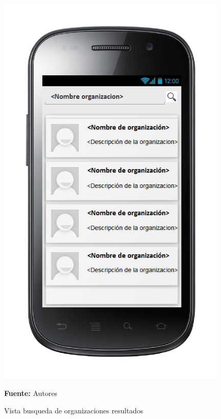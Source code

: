 \begin{figure}[!htb]
  \begin{center}
\includegraphics[width=11cm]{./imagenes/UI/Usuarios/busqueda_de_organizaciones_resultados.png}
    \caption{Vista busqueda de organizaciones resultados}
    \label{fig:Vista_busqueda_de_organizaciones_resultados}
    \textbf{Fuente:}  Autores
  \end{center}
\end{figure}
